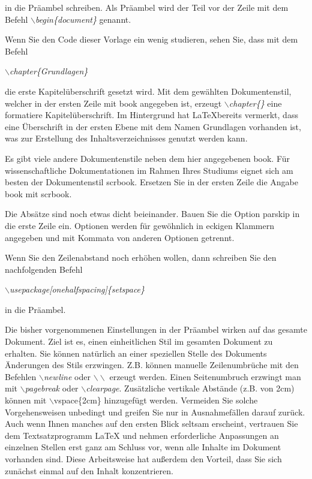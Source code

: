 \documentclass[ngerman]{book}	%
\begin{document}
in die Präambel schreiben. Als \glqq Präambel\grqq\; wird der Teil vor der Zeile mit dem Befehl \textit{$\backslash$begin\{document\}} genannt.

Wenn Sie den Code dieser Vorlage ein wenig studieren, sehen Sie, dass mit dem Befehl

\textit{$\backslash$chapter\{Grundlagen\}}

die erste Kapitelüberschrift gesetzt wird. Mit dem gewählten Dokumentenstil, welcher in der ersten Zeile mit \glqq book\grqq\; angegeben ist, erzeugt \textit{$\backslash$chapter\{\}} eine formatiere Kapitelüberschrift. Im Hintergrund hat \LaTeX bereits vermerkt, dass eine Überschrift in der ersten Ebene mit dem Namen \glqq Grundlagen\grqq\; vorhanden ist, was zur Erstellung des Inhaltsverzeichnisses genutzt werden kann.

Es gibt viele andere Dokumentenstile neben dem hier angegebenen \glqq book\grqq. Für wissenschaftliche Dokumentationen im Rahmen Ihres Studiums eignet sich am besten der Dokumentenstil \glqq scrbook\grqq\;. Ersetzen Sie in der ersten Zeile die Angabe \glqq book\grqq\; mit \glqq scrbook\grqq.

Die Absätze sind noch etwas dicht beieinander. Bauen Sie die Option \glqq parskip\grqq\; in die erste Zeile ein. Optionen werden für gewöhnlich in eckigen Klammern angegeben und mit Kommata von anderen Optionen getrennt.

Wenn Sie den Zeilenabstand noch erhöhen wollen, dann schreiben Sie den nachfolgenden Befehl

\textit{$\backslash$usepackage[onehalfspacing]\{setspace\}}

in die Präambel.

Die bisher vorgenommenen Einstellungen in der Präambel wirken auf das gesamte Dokument. Ziel ist es, einen einheitlichen Stil im gesamten Dokument zu erhalten. Sie können natürlich an einer speziellen Stelle des Dokuments Änderungen des Stils erzwingen. Z.B. können manuelle Zeilenumbrüche mit den Befehlen \textit{$\backslash$newline} oder $\backslash\backslash$ erzeugt werden. Einen Seitenumbruch erzwingt man mit \textit{$\backslash$pagebreak} oder \textit{$\backslash$clearpage}. Zusätzliche vertikale Abstände (z.B. von 2\;cm) können mit $\backslash$vspace\{2cm\} hinzugefügt werden. Vermeiden Sie solche Vorgehensweisen unbedingt und greifen Sie nur in Ausnahmefällen darauf zurück. Auch wenn Ihnen manches auf den ersten Blick seltsam erscheint, vertrauen Sie dem Textsatzprogramm \LaTeX\; und nehmen erforderliche Anpassungen an einzelnen Stellen erst ganz am Schluss vor, wenn alle Inhalte im Dokument vorhanden sind. Diese Arbeitsweise hat außerdem den Vorteil, dass Sie sich zunächst einmal auf den Inhalt konzentrieren.
\end{document}
